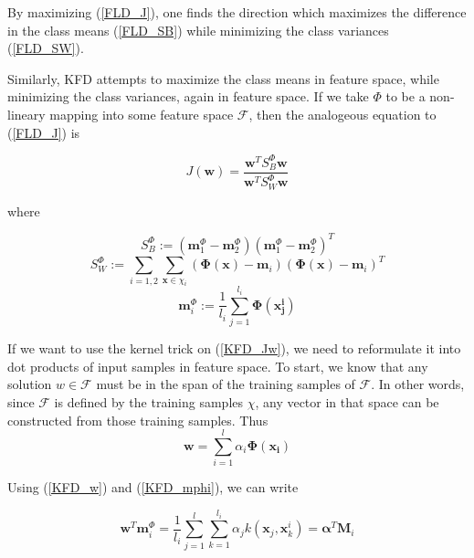\documentclass[12pt]{article}
\begin{document}
By maximizing (\ref{FLD_J}), one finds the direction which maximizes the difference in the class means (\ref{FLD_SB}) while minimizing the class variances (\ref{FLD_SW}).

Similarly, KFD attempts to maximize the class means in feature space, while minimizing the class variances, again in feature space.  If we take $\Phi$ to be a non-lineary mapping into some feature space $\mathcal{F}$, then the analogeous equation to (\ref{FLD_J}) is

\begin{equation}
J(\boldsymbol{w}) = \frac{\boldsymbol{w}^T S_B^\Phi \boldsymbol{w}}{\boldsymbol{w}^T S_W^\Phi \boldsymbol{w}}
\label{KFD_Jw}
\end{equation}

where 

\begin{equation}
S_B^\Phi := (\boldsymbol{m}_1^\Phi - \boldsymbol{m}_2^\Phi)(\boldsymbol{m}_1^\Phi - \boldsymbol{m}_2^\Phi)^T
\label{KFD_SBphi}
\end{equation}
\begin{equation}
S_W^\Phi := \sum_{i=1,2} \sum_{\boldsymbol{x} \in \chi_i} (\boldsymbol{\Phi(x)}-\boldsymbol{m}_i)(\boldsymbol{\Phi(x)}-\boldsymbol{m}_i)^T
\label{KFD_SWphi}
\end{equation}
\begin{equation}
\boldsymbol{m}_i^\Phi := \frac{1}{l_i} \sum_{j=1}^{l_i} \boldsymbol{\Phi(x_j^i)}
\label{KFD_mphi}
\end{equation}

If we want to use the kernel trick on (\ref{KFD_Jw}), we need to reformulate it into dot products of input samples in feature space.  To start, we know that any solution $w\in\mathcal{F}$ must be in the span of the training samples of $\mathcal{F}$.  In other words, since $\mathcal{F}$ is defined by the training samples $\chi$, any vector in that space can be constructed from those training samples.  Thus
\begin{equation}
\boldsymbol{w} = \sum_{i=1}^{l} \alpha_i \boldsymbol{\Phi(x_i)}
\label{KFD_w}
\end{equation}

Using (\ref{KFD_w}) and (\ref{KFD_mphi}), we can write

\begin{equation}
\boldsymbol{w}^T \boldsymbol{m}_i^\Phi = \frac{1}{l_i} \sum_{j=1}^{l}\sum_{k=1}^{l_i} \alpha_j k(\boldsymbol{x}_j, \boldsymbol{x}_k^i) = \boldsymbol{\alpha}^T \boldsymbol{M}_i
\label{KFD_wT_miphi}
\end{equation}
\end{document}
